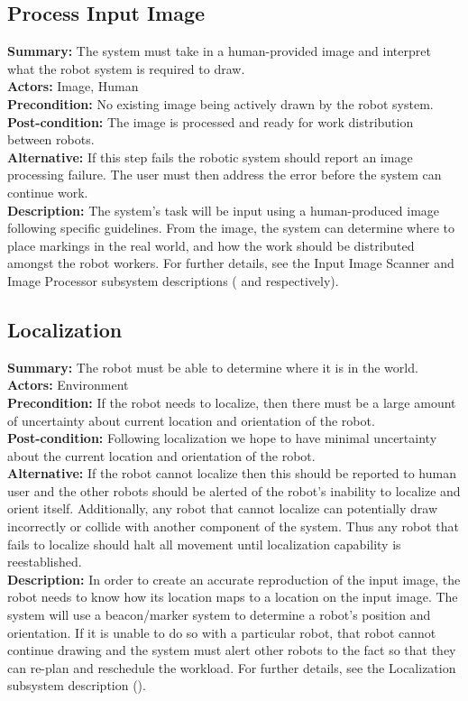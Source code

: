 \subsection{Process Input Image}
\textbf{Summary:} The system must take in a human-provided image and interpret what the robot system is required to draw. \\
\textbf{Actors:} Image, Human \\
\textbf{Precondition:}  No existing image being actively drawn by the robot system. \\
\textbf{Post-condition:} The image is processed and ready for work distribution between robots. \\
\textbf{Alternative:} If this step fails the robotic system should report an image processing failure. The user must then address the error before the system can continue work.\\
\textbf{Description:} The system's task will be input using a human-produced image following specific guidelines. From the image, the system can determine where to place markings in the real world, and how the work should be distributed amongst the robot workers. For further details, see the Input Image Scanner and Image Processor subsystem descriptions ( and  respectively).\\

\subsection{Localization}
\textbf{Summary:} The robot must be able to determine where it is in the world. \\
\textbf{Actors:} Environment \\
\textbf{Precondition:} If the robot needs to localize, then there must be a large amount of uncertainty about current location and orientation of the robot. \\
\textbf{Post-condition:} Following localization we hope to have minimal uncertainty about the current location and orientation of the robot. \\
\textbf{Alternative:} If the robot cannot localize then this should be reported to human user and the other robots should be alerted of the robot's inability to localize and orient itself. Additionally, any robot that cannot localize can potentially draw incorrectly or collide with another component of the system. Thus any robot that fails to localize should halt all movement until localization capability is reestablished.\\
\textbf{Description:} In order to create an accurate reproduction of the input image, the robot needs to know how its location maps to a location on the input image. The system will use a beacon/marker system to determine a robot's position and orientation. If it is unable to do so with a particular robot, that robot cannot continue drawing and the system must alert other robots to the fact so that they can re-plan and reschedule the workload. For further details, see the Localization subsystem description ().\\

